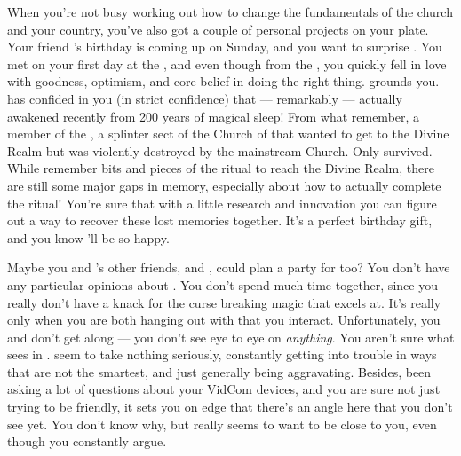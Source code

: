 \documentclass[char]{GL2020}
\begin{document}
When you're not busy working out how to change the fundamentals of the church and your country, you've also got a couple of personal projects on your plate. Your friend \cDisney{\intro}'s birthday is coming up on Sunday, and you want to surprise \cDisney{\them}. You met \cDisney{} on your first day at the \pSc{}, and even though \cDisney{\theyare} from the \pFarm{}, you quickly fell in love with \cDisney{\their} goodness, optimism, and core belief in doing the right thing. \cDisney{} grounds you. \cDisney{} has confided in you (in strict confidence) that — remarkably — \cDisney{\theywere} actually awakened recently from 200 years of magical sleep! From what \cDisney{\they} remember\cDisney{\verbs}, \cDisney{\theyare} a member of the \cDisneySect{\intro}, a splinter sect of the Church of \cFarmGod{\intro} that wanted to get to the Divine Realm but was violently destroyed by the mainstream Church. Only \cDisney{\they} survived. While \cDisney{\they} remember\cDisney{\verbs} bits and pieces of the ritual to reach the Divine Realm, there are still some major gaps in \cDisney{\their} memory, especially about how to actually complete the ritual! You're sure that with a little research and innovation you can figure out a way to recover these lost memories together. It's a perfect birthday gift, and you know \cDisney{\they}'ll be so happy.

Maybe you and \cDisney{}'s other friends, \cAdopted{\intro} and \cPirateChild{\intro}, could plan a party for \cDisney{\them} too? You don’t have any particular opinions about \cAdopted{}. You don’t spend much time together, since you really don’t have a knack for the curse breaking magic that \cAdopted{} excels at. It’s really only when you are both hanging out with \cDisney{} that you interact. Unfortunately, you and \cPirateChild{} don't get along — you don't see eye to eye on \emph{anything}. You aren't sure what \cDisney{} sees in \cPirateChild{\them}. \cPirateChild{\They} seem\cPirateChild{\verbs} to take nothing seriously, constantly getting into trouble in ways that are not the smartest, and just generally being aggravating. Besides, \cPirateChild{\theyhave} been asking a lot of questions about your VidCom devices, and you are sure \cPirateChild{\theyare} not just trying to be friendly, it sets you on edge that there’s an angle here that you don’t see yet. You don’t know why, but \cPirateChild{} really seems to want to be close to you, even though you constantly argue.
\end{document}
